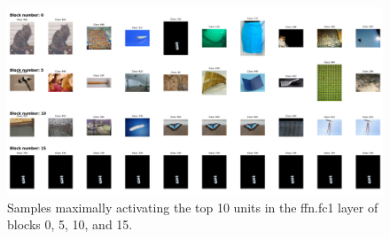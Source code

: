 \documentclass{article} %
\begin{document}
\begin{figure}[ht]
   \centering
   \includegraphics[width=\textwidth]{figures/mem_samples_per_layer.pdf}
   \caption{Samples maximally activating the top 10 units in the ffn.fc1 layer of blocks 0, 5, 10, and 15.}
   \label{fig:mem_samples_per_layer}
\end{figure}
\end{document}
